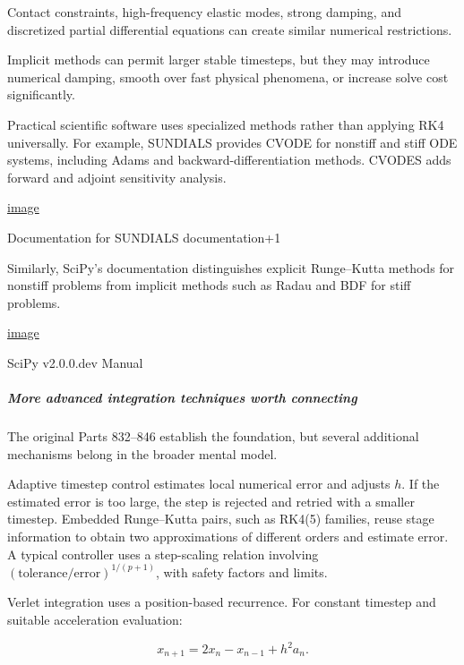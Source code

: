 Contact constraints, high-frequency elastic modes, strong damping, and discretized partial differential equations can create similar numerical restrictions.

Implicit methods can permit larger stable timesteps, but they may introduce numerical damping, smooth over fast physical phenomena, or increase solve cost significantly.

Practical scientific software uses specialized methods rather than applying RK4 universally. For example, SUNDIALS provides CVODE for nonstiff and stiff ODE systems, including Adams and backward-differentiation methods. CVODES adds forward and adjoint sensitivity analysis. 

\href{https://www.google.com/s2/favicons?domain=https://sundials.readthedocs.io&sz=32}{image}

Documentation for SUNDIALS documentation+1

Similarly, SciPy's  documentation distinguishes explicit Runge--Kutta methods for nonstiff problems from implicit methods such as Radau and BDF for stiff problems. 

\href{https://www.google.com/s2/favicons?domain=https://scipy.github.io&sz=32}{image}

SciPy v2.0.0.dev Manual

\subparagraph{More advanced integration techniques worth connecting}\label{02-foundations-ii-ch025-more-advanced-integration-techniques-worth-connecting}

\hypertarget{02-foundations-ii-ch025-more-advanced-integration-techniques-worth-connecting}{}

The original Parts 832--846 establish the foundation, but several additional mechanisms belong in the broader mental model.

Adaptive timestep control estimates local numerical error and adjusts \(h\). If the estimated error is too large, the step is rejected and retried with a smaller timestep. Embedded Runge--Kutta pairs, such as RK4(5) families, reuse stage information to obtain two approximations of different orders and estimate error. A typical controller uses a step-scaling relation involving \((\text{tolerance}/\text{error})^{1/(p+1)}\), with safety factors and limits.

Verlet integration uses a position-based recurrence. For constant timestep and suitable acceleration evaluation:

\[
x_{n+1}=2x_n-x_{n-1}+h^2a_n.
\]

